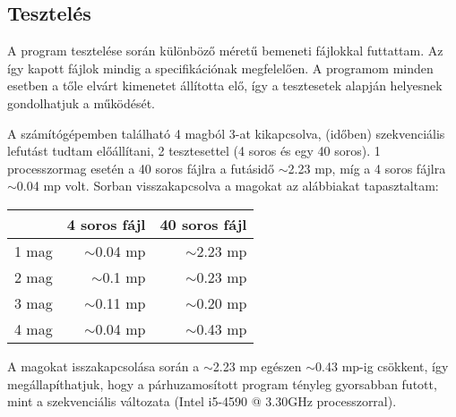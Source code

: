 \documentclass[12pt]{article}
\begin{document}
\subsection{Tesztelés}

A program tesztelése során különböző méretű bemeneti fájlokkal futtattam. Az így kapott fájlok mindig a specifikációnak megfelelően.
A programom minden esetben a tőle elvárt kimenetet állította elő, így a tesztesetek alapján helyesnek gondolhatjuk a működését.

A számítógépemben található 4 magból 3-at kikapcsolva, (időben) szekvenciális lefutást tudtam előállítani, 2 tesztesettel (4 soros és egy 40 soros). 1 processzormag esetén a 40 soros fájlra a futásidő $\sim$2.23 mp, míg a 4 soros fájlra $\sim$0.04 mp volt.
Sorban visszakapcsolva a magokat az alábbiakat tapasztaltam:

\begin{center}
    \begin{tabular}{| l | r | r |}
      \hline
       & 4 soros fájl & 40 soros fájl \\ \hline
      1 mag & $\sim$0.04 mp & $\sim$2.23 mp \\ \hline
      2 mag & $\sim$0.1 mp & $\sim$0.23 mp \\ \hline
      3 mag & $\sim$0.11 mp & $\sim$0.20 mp \\ \hline
      4 mag & $\sim$0.04 mp & $\sim$0.43 mp \\
      \hline
    \end{tabular}
\end{center}

A magokat isszakapcsolása során a $\sim$2.23 mp egészen $\sim$0.43 mp-ig csökkent, így megállapíthatjuk, hogy a párhuzamosított program tényleg gyorsabban futott, mint a szekvenciális változata (Intel i5-4590 @ 3.30GHz processzorral).\\
\\
\end{document}
